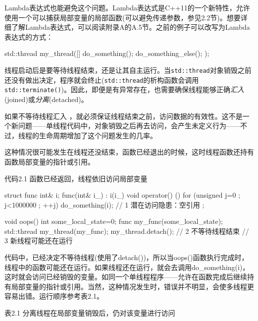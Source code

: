 Lambda表达式也能避免这个问题。Lambda表达式是C++11的一个新特性，允许使用一个可以捕获局部变量的局部函数(可以避免传递参数，参见2.2节)。想要详细了解Lambda表达式，可以阅读附录A的A.5节。之前的例子可以改写为Lambda表达式的方式：

\begin{cpp}
std::thread my_thread([]{
  do_something();
  do_something_else();
});
\end{cpp}

线程启动后是要等待线程结束，还是让其自主运行。当\texttt{std::thread}对象销毁之前还没有做出决定，程序就会终止(\texttt{std::thread}的析构函数会调用\texttt{std::terminate()})。因此，即便是有异常存在，也需要确保线程能够正确\textit{汇入}(joined)或\textit{分离}(detached)。

如果不等待线程汇入 ，就必须保证线程结束之前，访问数据的有效性。这不是一个新问题——单线程代码中，对象销毁之后再去访问，会产生未定义行为——不过，线程的生命周期增加了这个问题发生的几率。

这种情况很可能发生在线程还没结束，函数已经退出的时候，这时线程函数还持有函数局部变量的指针或引用。

代码2.1  函数已经返回，线程依旧访问局部变量

\begin{cpp}
struct func
{
  int& i;
  func(int& i_) : i(i_) {}
  void operator() ()
  {
    for (unsigned j=0 ; j<1000000 ; ++j)
    {
      do_something(i);           // 1 潜在访问隐患：空引用
    }
  }
};

void oops()
{
  int some_local_state=0;
  func my_func(some_local_state);
  std::thread my_thread(my_func);
  my_thread.detach();          // 2 不等待线程结束
}                              // 3 新线程可能还在运行
\end{cpp}

代码中，已经决定不等待线程(使用了detach())，所以当oops()函数执行完成时，线程中的函数可能还在运行。如果线程还在运行，就会去调用do\_something(i)，这时就会访问已经销毁的变量。如同一个单线程程序——允许在函数完成后继续持有局部变量的指针或引用。当然，这种情况发生时，错误并不明显，会使多线程更容易出错。运行顺序参考表2.1。

表2.1 分离线程在局部变量销毁后，仍对该变量进行访问

